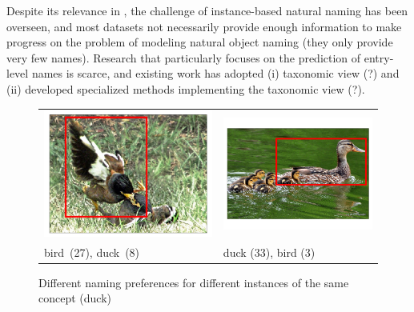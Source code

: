 Despite its relevance in \lv, the challenge of instance-based natural naming has been overseen, and most \lv datasets not necessarily provide enough information to make progress on the problem of modeling natural object naming (they only provide very few names). 
Research that particularly focuses on the prediction of entry-level names is scarce, and existing work has adopted (i) taxonomic view (?) and (ii) developed specialized methods implementing the taxonomic view (?)\cite{Ordonez:2016}. 
%
\begin{figure}
	\centering
	\small
	\begin{tabular}{p{3cm}p{3cm}}
		\centering
		\includegraphics[scale=0.15]{images/2327551_2960743_seed_ambiguous.png} &
		\includegraphics[scale=0.15]{images/2358126_805887_singleton_obj.png}\\
		bird\ (27),  duck\ (8) & duck (33), bird (3)\\
	\end{tabular}
	
	\caption{Different naming preferences for different instances of the same concept (duck)\label{fig:duck}}
\end{figure}
